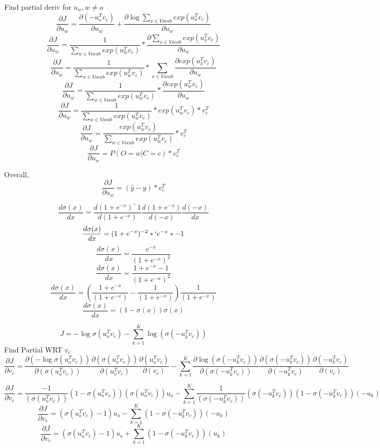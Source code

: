 \documentclass[11pt,largemargins]{homework}
\begin{document}
Find partial deriv for $u_w, w \ne o$
$$ \frac{\partial{J}}{\partial{u_w}} = \frac{\partial{(- u_o^T v_c)}}{\partial{u_w}} + \frac{\partial{\log{\sum_{x \in Vocab}{exp(u^T_x  v_c)}}}}{\partial{u_w}} $$
$$ \frac{\partial{J}}{\partial{u_w}} = \frac{1}{\sum_{w \in Vocab}{exp(u^T_w  v_c)}} * \frac{\partial{\sum_{x \in Vocab}{exp(u^T_x  v_c)}}}{\partial{u_w}} $$
$$ \frac{\partial{J}}{\partial{u_w}} = \frac{1}{\sum_{w \in Vocab}{exp(u^T_w  v_c)}} * \sum_{x \in Vocab}\frac{\partial{{exp(u^T_x  v_c)}}}{\partial{u_w}} $$
$$ \frac{\partial{J}}{\partial{u_w}} = \frac{1}{\sum_{w \in Vocab}{exp(u^T_w  v_c)}} * \frac{\partial{exp(u^T_w  v_c)}}{\partial{u_w}} $$
$$ \frac{\partial{J}}{\partial{u_w}} = \frac{1}{\sum_{w \in Vocab}{exp(u^T_w  v_c)}} *exp(u^T_w  v_c)* v_c^T $$
$$ \frac{\partial{J}}{\partial{u_w}} = \frac{exp(u^T_w  v_c)}{\sum_{w \in Vocab}{exp(u^T_w  v_c)}} * v_c^T $$
$$ \frac{\partial{J}}{\partial{u_w}} = P(O=w|C=c) * v_c^T $$

Overall, 
$$ \frac{\partial{J}}{\partial{u_w}} =  (\hat{y} - y) * v_c^T $$

\question
$$\frac{d{\sigma(x)}}{d{x}} = \frac{d(1+e^{-x})^-1}{d(1+e^{-x})} \frac{d(1+e^{-x})}{d(-x)} \frac{d(-x)}{d{x}}$$
$$\frac{d{\sigma(x)}}{d{x}} = (1+e^{-x})^{-2}*` e^{-x}* -1$$
$$\frac{d{\sigma(x)}}{d{x}} = \frac{ e^{-x}}{(1+e^{-x})^{2}}$$
$$\frac{d{\sigma(x)}}{d{x}} = \frac{ 1+e^{-x}-1}{(1+e^{-x})^{2}}$$
$$\frac{d{\sigma(x)}}{d{x}} = (\frac{ 1+e^{-x}}{(1+e^{-x})} - \frac{1}{(1+e^{-x})} ) \frac{ 1}{(1+e^{-x})}$$
$$\frac{d{\sigma(x)}}{d{x}} = (1 - \sigma{(x)}) \sigma{(x)} $$ 



\question

$$ J = -\log{\sigma{(u_o^T v_c)}} - \sum_{k=1}^K \log{(\sigma{(-u_k^T v_c)})} $$
Find Partial WRT $v_c$ 
$$ \frac{\partial{J}}{\partial{v_c}} = \frac{\partial{(-\log{\sigma{(u_o^T v_c)}})}}{\partial{(\sigma{(u_o^T v_c)})}} \frac{{\partial{(\sigma{(u_o^T v_c)})}}}{\partial{(u_o^T v_c)}}\frac{\partial{(u_o^T v_c)}}{\partial{(v_c)}} - \sum_{k=1}^K \frac{\partial{\log{(\sigma{(-u_k^T v_c)})}}}{\partial{(\sigma{(-u_k^T v_c)})}} \frac{\partial{(\sigma{(-u_k^T v_c)})}} {\partial{(-u_k^T v_c)}} \frac{\partial{(-u_k^T v_c)}}{\partial{(v_c)}}$$

$$ \frac{\partial{J}}{\partial{v_c}} = \frac{-1}{(\sigma{(u_o^T v_c)})} (1 - \sigma{(u_o^T v_c)})(\sigma{(u_o^T v_c)})u_o - \sum_{k=1}^K \frac{1}{(\sigma{(-u_k^T v_c)})} (\sigma{(-u_k^T v_c)})(1-\sigma{(-u_k^T v_c)}) (-u_k)$$
$$ \frac{\partial{J}}{\partial{v_c}} = (\sigma{(u_o^T v_c)} - 1) u_o - \sum_{k=1}^K (1-\sigma{(-u_k^T v_c)}) (-u_k)$$
$$ \frac{\partial{J}}{\partial{v_c}} = (\sigma{(u_o^T v_c)} - 1) u_o + \sum_{k=1}^K (1-\sigma{(-u_k^T v_c)}) (u_k)$$
\end{document}
